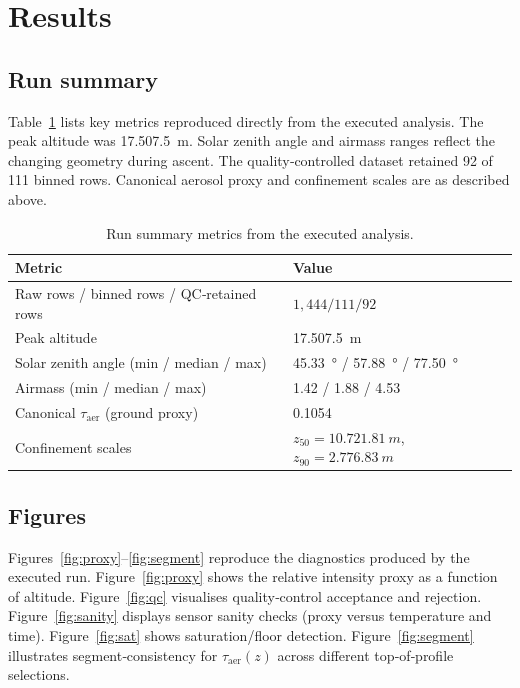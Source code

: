 \documentclass[11pt]{article}
\begin{document}
\section{Results}
\subsection{Run summary}
Table~\ref{tab:summary} lists key metrics reproduced directly from the executed analysis.  The peak altitude was \SI{17,507.5}{m}.  Solar zenith angle and airmass ranges reflect the changing geometry during ascent.  The quality‑controlled dataset retained 92 of 111 binned rows.  Canonical aerosol proxy and confinement scales are as described above.

\begin{table}[h]
\centering
\caption{Run summary metrics from the executed analysis.}
\label{tab:summary}
\begin{tabular}{@{}ll@{}}
\toprule
Metric & Value \\ \midrule
Raw rows / binned rows / QC‑retained rows & $1{,}444 / 111 / 92$ \\ 
Peak altitude & \SI{17,507.5}{m} \\ 
Solar zenith angle (min / median / max) & \SI{45.33}{\degree} / \SI{57.88}{\degree} / \SI{77.50}{\degree} \\ 
Airmass (min / median / max) & 1.42 / 1.88 / 4.53 \\ 
Canonical $\tau_{\mathrm{aer}}$ (ground proxy) & 0.1054 \\ 
Confinement scales & $z_{50}=\SI{10,721.81}{m}$, $z_{90}=\SI{2,776.83}{m}$ \\ 
\bottomrule
\end{tabular}
\end{table}

\subsection{Figures}
Figures~\ref{fig:proxy}–\ref{fig:segment} reproduce the diagnostics produced by the executed run.  Figure~\ref{fig:proxy} shows the relative intensity proxy as a function of altitude.  Figure~\ref{fig:qc} visualises quality‑control acceptance and rejection.  Figure~\ref{fig:sanity} displays sensor sanity checks (proxy versus temperature and time).  Figure~\ref{fig:sat} shows saturation/floor detection.  Figure~\ref{fig:segment} illustrates segment‑consistency for $\tau_{\mathrm{aer}}(z)$ across different top‑of‑profile selections.
\end{document}
